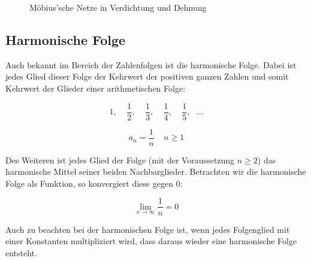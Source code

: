 \documentclass[12pt,a4paper]{article}
\begin{document}
\begin{figure} [htbp]
 \hfill
{}
\caption{Möbius'sche Netze in Verdichtung und Dehnung}
\end{figure} 

\newpage
\subsection{Harmonische Folge}
\label{subsec:harmFolge}

Auch bekannt im Bereich der Zahlenfolgen ist die harmonische Folge. Dabei ist jedes Glied dieser Folge der Kehrwert der positiven ganzen Zahlen und somit Kehrwert der Glieder einer arithmetischen Folge: 

\[ 1,~~~~~\dfrac{1}{2},~~~~~\dfrac{1}{3},~~~~~\dfrac{1}{4},~~~~~\dfrac{1}{5},~~~\dots\]

\[ a_n = \dfrac{1}{n} ~~~~~ n \geq 1\]

Des Weiteren ist jedes Glied der Folge (mit der Voraussetzung $n \geq 2$) das harmonische Mittel seiner beiden Nachbarglieder. Betrachten wir die harmonische Folge als Funktion, so konvergiert diese gegen 0:

\[ \lim_{x \to \infty} \dfrac{1}{n} = 0\]

Auch zu beachten bei der harmonischen Folge ist, wenn jedes Folgenglied mit einer Konstanten multipliziert wird, dass daraus wieder eine harmonische Folge entsteht.
\end{document}
